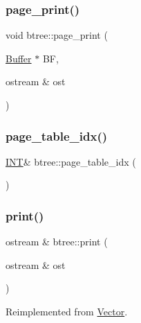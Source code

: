\mbox{\label{classbtree_ae6ffbcdff58a0c738d1a0e27a963da5d}} 
\subsubsection{\texorpdfstring{page\+\_\+print()}{page\_print()}}
{\footnotesize\ttfamily void btree\+::page\+\_\+print (\begin{DoxyParamCaption}\item[{\mbox{\hyperlink{discreta_8h_a4966414b761cd8d10ba385fe5e7c07fc}{Buffer}} $\ast$}]{BF,  }\item[{ostream \&}]{ost }\end{DoxyParamCaption})}

\mbox{\label{classbtree_abc6a6f309e4c61cb5a7f4c4a248d384d}} 
\subsubsection{\texorpdfstring{page\+\_\+table\+\_\+idx()}{page\_table\_idx()}}
{\footnotesize\ttfamily \mbox{\hyperlink{galois_8h_a09fddde158a3a20bd2dcadb609de11dc}{I\+NT}}\& btree\+::page\+\_\+table\+\_\+idx (\begin{DoxyParamCaption}{ }\end{DoxyParamCaption})\hspace{0.3cm}{\ttfamily [inline]}}

\mbox{\label{classbtree_a76cbc154a13a6464d16a7f080cef40d3}} 
\subsubsection{\texorpdfstring{print()}{print()}}
{\footnotesize\ttfamily ostream \& btree\+::print (\begin{DoxyParamCaption}\item[{ostream \&}]{ost }\end{DoxyParamCaption})\hspace{0.3cm}{\ttfamily [virtual]}}



Reimplemented from \mbox{\hyperlink{class_vector_a71d7e24bcfdfc69d4a2137360acb066c}{Vector}}.

